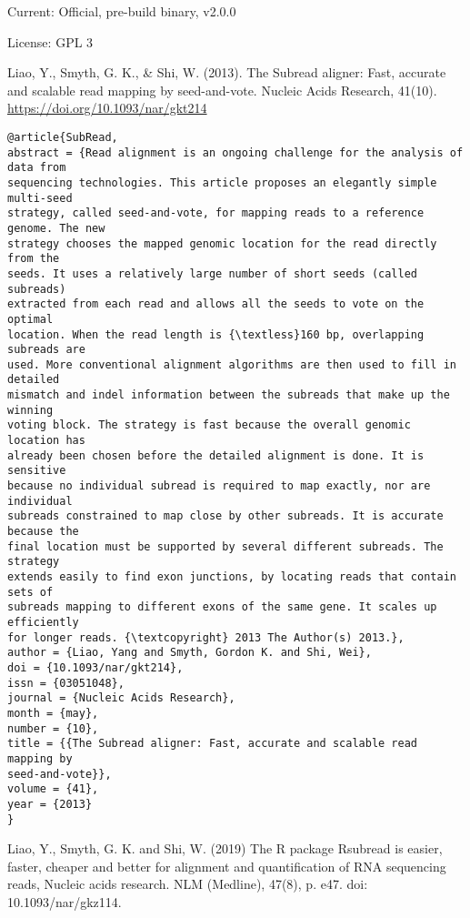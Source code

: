 \documentclass[]{article}
\begin{document}
Current: Official, pre-build binary, v2.0.0

License: GPL 3

Liao, Y., Smyth, G. K., \& Shi, W. (2013). The Subread aligner: Fast, accurate and scalable read mapping by seed-and-vote. Nucleic Acids Research, 41(10). \url{https://doi.org/10.1093/nar/gkt214}

\begin{verbatim}
@article{SubRead,
abstract = {Read alignment is an ongoing challenge for the analysis of data from
sequencing technologies. This article proposes an elegantly simple multi-seed
strategy, called seed-and-vote, for mapping reads to a reference genome. The new
strategy chooses the mapped genomic location for the read directly from the
seeds. It uses a relatively large number of short seeds (called subreads)
extracted from each read and allows all the seeds to vote on the optimal
location. When the read length is {\textless}160 bp, overlapping subreads are
used. More conventional alignment algorithms are then used to fill in detailed
mismatch and indel information between the subreads that make up the winning
voting block. The strategy is fast because the overall genomic location has
already been chosen before the detailed alignment is done. It is sensitive
because no individual subread is required to map exactly, nor are individual
subreads constrained to map close by other subreads. It is accurate because the
final location must be supported by several different subreads. The strategy
extends easily to find exon junctions, by locating reads that contain sets of
subreads mapping to different exons of the same gene. It scales up efficiently
for longer reads. {\textcopyright} 2013 The Author(s) 2013.},
author = {Liao, Yang and Smyth, Gordon K. and Shi, Wei},
doi = {10.1093/nar/gkt214},
issn = {03051048},
journal = {Nucleic Acids Research},
month = {may},
number = {10},
title = {{The Subread aligner: Fast, accurate and scalable read mapping by
seed-and-vote}},
volume = {41},
year = {2013}
}
\end{verbatim}

Liao, Y., Smyth, G. K. and Shi, W. (2019) The R package Rsubread is easier, faster, cheaper and better for alignment and quantification of RNA sequencing reads, Nucleic acids research. NLM (Medline), 47(8), p. e47. doi: 10.1093/nar/gkz114.
\end{document}
